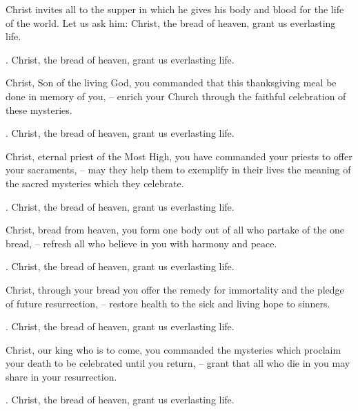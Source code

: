 \lettrine[lines=2]{C}{}hrist invites all to the supper in which he gives his body and blood for the life of the world. Let us ask him: Christ, the bread of heaven, grant us everlasting life.
\par \Rbar. Christ, the bread of heaven, grant us everlasting life.

Christ, Son of the living God, you commanded that this thanksgiving meal be done in memory of you,
– enrich your Church through the faithful celebration of these mysteries.
\par \Rbar. Christ, the bread of heaven, grant us everlasting life.

Christ, eternal priest of the Most High, you have commanded your priests to offer your sacraments,
– may they help them to exemplify in their lives the meaning of the sacred mysteries which they celebrate.
\par \Rbar. Christ, the bread of heaven, grant us everlasting life.

Christ, bread from heaven, you form one body out of all who partake of the one bread,
– refresh all who believe in you with harmony and peace.
\par \Rbar. Christ, the bread of heaven, grant us everlasting life.

Christ, through your bread you offer the remedy for immortality and the pledge of future resurrection,
– restore health to the sick and living hope to sinners.
\par \Rbar. Christ, the bread of heaven, grant us everlasting life.

Christ, our king who is to come, you commanded the mysteries which proclaim your death to be celebrated until you return,
– grant that all who die in you may share in your resurrection.
\par \Rbar. Christ, the bread of heaven, grant us everlasting life.
